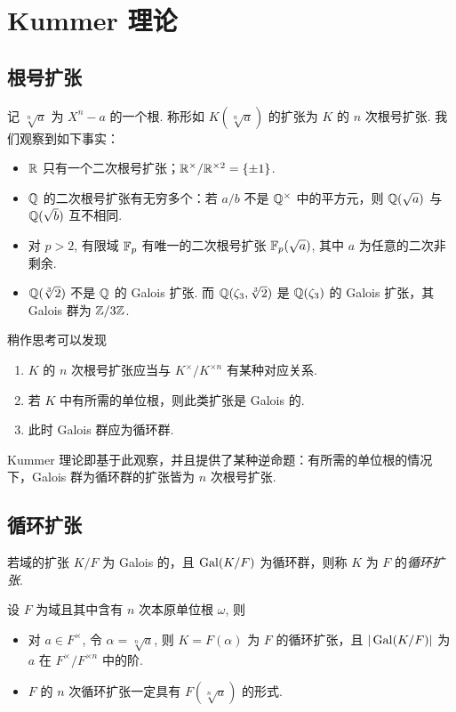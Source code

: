 \chapter{Kummer 理论}

\section{根号扩张}
记 $\sqrt[n]{a}$ 为 $X^n - a$ 的一个根.  称形如 $K(\sqrt[n]{a})$ 的扩张为 $K$ 的 $n$ 次根号扩张.  我们观察到如下事实：
\begin{fact}
  \begin{itemize}
  \item $\mathbb R$ 只有一个二次根号扩张；$\mathbb R^\times / \mathbb R^{\times2} = \{\pm 1\}$.
  \item $\mathbb Q$ 的二次根号扩张有无穷多个：若 $a/b$ 不是 $\mathbb Q^\times$ 中的平方元，则 $\mathbb Q(\sqrt a)$ 与 $\mathbb Q(\sqrt b)$ 互不相同.
  \item 对 $p > 2$, 有限域 $\mathbb F_p$ 有唯一的二次根号扩张 $\mathbb F_p(\sqrt a)$, 其中 $a$ 为任意的二次非剩余.
  \item $\mathbb Q(\sqrt[3]{2})$ 不是 $\mathbb Q$ 的 Galois 扩张.  而 $\mathbb Q(\zeta_3, \sqrt[3]{2})$ 是 $\mathbb Q(\zeta_3)$ 的 Galois 扩张，其 Galois 群为 $\mathbb Z/3\mathbb Z$.
  \end{itemize}
\end{fact}
稍作思考可以发现
\begin{obs}
  \begin{enumerate}
  \item $K$ 的 $n$ 次根号扩张应当与 $K^\times / K^{\times n}$ 有某种对应关系.
  \item 若 $K$ 中有所需的单位根，则此类扩张是 Galois 的.
  \item 此时 Galois 群应为循环群.
  \end{enumerate}
\end{obs}

Kummer 理论即基于此观察，并且提供了某种逆命题：有所需的单位根的情况下，Galois 群为循环群的扩张皆为 $n$ 次根号扩张.

\section{循环扩张}
\begin{defn}
  若域的扩张 $K/F$ 为 Galois 的，且 $\operatorname{Gal}(K/F)$ 为循环群，则称 $K$ 为 $F$ 的\emph{循环扩张}.
\end{defn}

\begin{thm}
  设 $F$ 为域且其中含有 $n$ 次本原单位根 $\omega$, 则
  \begin{itemize}
  \item 对 $a \in F^\times$, 令 $\alpha = \sqrt[n]{a}$, 则 $K = F(\alpha)$ 为 $F$ 的循环扩张，且 $|\operatorname{Gal}(K/F)|$ 为 $a$ 在 $F^\times / F^{\times n}$ 中的阶.
  \item $F$ 的 $n$ 次循环扩张一定具有 $F(\sqrt[n]{a})$ 的形式.
  \end{itemize}
  \label{thm:cyclic-form}
\end{thm}

